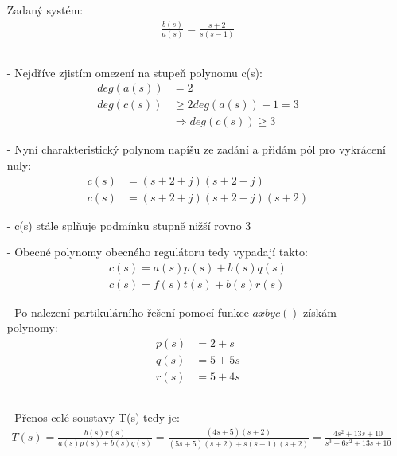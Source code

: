 \documentclass{article}
\begin{document}
\begin{itemize}
    \item[] Zadaný systém: 
    \begin{align*}
        \frac{b(s)}{a(s)} = \frac{s+2}{s(s-1)}
    \end{align*}

    \subsection{}
    \item[-] Nejdříve zjistím omezení na stupeň polynomu c(s):
    \begin{align*}
        deg(a(s)) &= 2\\
        deg(c(s)) &\ge 2deg(a(s))-1 = 3\\
        &\Rightarrow deg(c(s)) \ge 3
    \end{align*}

    \item[-] Nyní charakteristický polynom napíšu ze zadání a přidám pól pro vykrácení nuly: 
    \begin{align*}
        c(s) &= (s+2+j)(s+2-j)\\
        c(s) &= (s+2+j)(s+2-j)(s+2)
    \end{align*}
    \item[-] c(s) stále splňuje podmínku stupně nižší rovno 3 

    \item[-] Obecné polynomy obecného regulátoru tedy vypadají takto: 
    \begin{align*}
        c(s) = a(s)p(s)+b(s)q(s)\\
        c(s) = f(s)t(s)+b(s)r(s)
    \end{align*}

    \item[-] Po nalezení partikulárního řešení pomocí funkce $axbyc()$ získám polynomy: 
    \begin{align*}
        p(s) &= 2 + s\\
        q(s) &= 5 + 5s\\
        r(s) &= 5 + 4s
    \end{align*}

    \subsection{}
    \item[-] Přenos celé soustavy T(s) tedy je:
    \begin{align*}
        T(s) = \frac{b(s)r(s)}{a(s)p(s)+b(s)q(s)} = \frac{(4 s + 5) (s + 2)}{(5 s + 5) (s + 2) + s (s - 1) (s + 2)} = \frac{4 s^2 + 13 s + 10}{s^3 + 6 s^2 + 13 s + 10}
    \end{align*}


\end{itemize}
\end{document}
